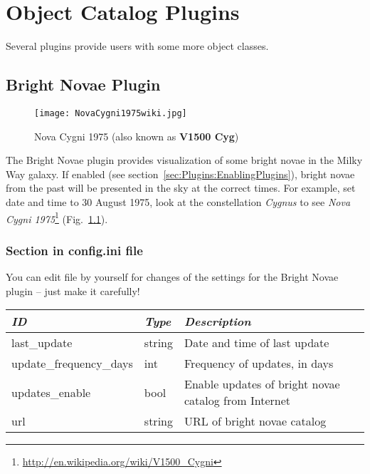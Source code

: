 
\chapter{Object Catalog Plugins}
Several plugins provide users with some more object classes. 


\section{Bright Novae Plugin}
\label{sec:plugins:BrightNovae}

\begin{figure}[ht]
\texttt{[image: NovaCygni1975wiki.jpg]}
\caption{Nova Cygni 1975 (also known as \textbf{V1500 Cyg})}
\label{fig:NovaCygni1975}
\end{figure}


\noindent The Bright Novae plugin provides visualization of some
bright novae in the Milky Way galaxy.
If enabled (see section~\ref{sec:Plugins:EnablingPlugins}), bright
novae from the past will be presented in the sky at the correct
times. For example, set date and time to 30 August 1975, look at the constellation \emph{Cygnus} to see
\emph{Nova Cygni 1975}\footnote{\url{http://en.wikipedia.org/wiki/V1500_Cygni}} (Fig.~\ref{fig:NovaCygni1975}).


\subsection{Section  in config.ini file}
\label{sec:plugins:BrightNovae:config}

You can edit  file by yourself for changes of the
settings for the Bright Novae plugin -- just make it carefully!

\noindent%
\begin{tabularx}{\textwidth}{l|l|X}\toprule
\emph{ID}            & \emph{Type} & \emph{Description}\\\midrule
last\_update            & string & Date and time of last update\\%
update\_frequency\_days & int    & Frequency of updates, in days\\%
updates\_enable         & bool   & Enable updates of bright novae catalog from Internet \\%
url                     & string & URL of bright novae catalog \\\bottomrule
\end{tabularx}

